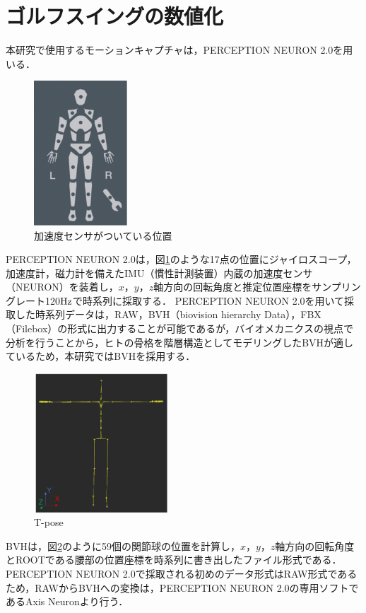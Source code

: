 \section{ゴルフスイングの数値化}
本研究で使用するモーションキャプチャは，PERCEPTION NEURON 2.0を用いる．
\begin{figure}
    \begin{center}
        \includegraphics[width=3.5cm]{./images/sensors.png}
        \caption{加速度センサがついている位置}
        \label{sensors}
    \end{center}
\end{figure}
PERCEPTION NEURON 2.0は，図\ref{sensors}のような17点の位置にジャイロスコープ，加速度計，磁力計を備えたIMU（慣性計測装置）内蔵の加速度センサ（NEURON）を装着し，$x$，$y$，$z$軸方向の回転角度と推定位置座標をサンプリングレート120$\rm{Hz}$で時系列に採取する．
PERCEPTION NEURON 2.0を用いて採取した時系列データは，RAW，BVH（biovision hierarchy Data），FBX（Filebox）の形式に出力することが可能であるが，バイオメカニクスの視点で分析を行うことから，ヒトの骨格を階層構造としてモデリングしたBVHが適しているため，本研究ではBVHを採用する．
\begin{figure}
    \begin{center}
        \includegraphics[width=5cm]{./images/Tpose.png}
        \caption{T-pose}
        \label{tpose}
    \end{center}
\end{figure}
BVHは，図\ref{tpose}のように59個の関節球の位置を計算し，$x$，$y$，$z$軸方向の回転角度とROOTである腰部の位置座標を時系列に書き出したファイル形式である．
PERCEPTION NEURON 2.0で採取される初めのデータ形式はRAW形式であるため，RAWからBVHへの変換は，PERCEPTION NEURON 2.0の専用ソフトであるAxis Neuronより行う．

